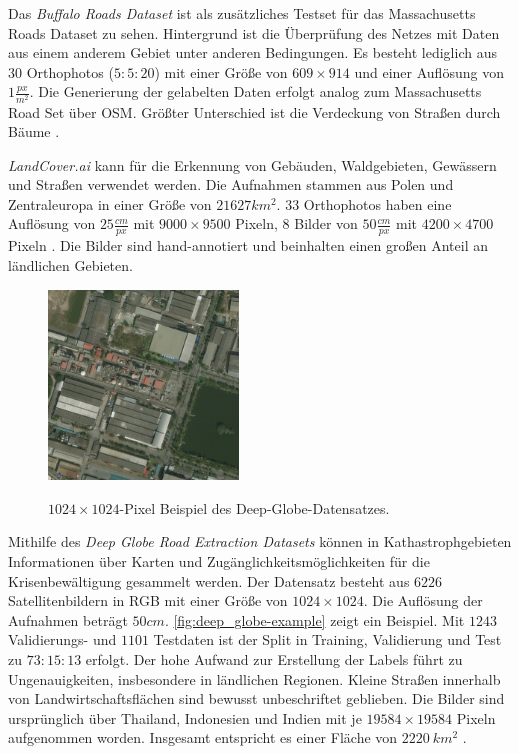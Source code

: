 Das \textit{Buffalo Roads Dataset} ist als zusätzliches Testset für das Massachusetts Roads Dataset zu sehen.
Hintergrund ist die Überprüfung des Netzes mit Daten aus einem anderem Gebiet unter anderen Bedingungen.
Es besteht lediglich aus 30 Orthophotos ($5:5:20$) mit einer Größe von $609{\times}914$ und einer Auflösung von $1 \frac{px}{m^2}$.
Die Generierung der gelabelten Daten erfolgt analog zum Massachusetts Road Set über \ac{OSM}.
Größter Unterschied ist die Verdeckung von Straßen durch Bäume \cite{Mnih.2013}.

\textit{LandCover.ai} kann für die Erkennung von Gebäuden, Waldgebieten, Gewässern und Straßen verwendet werden.
Die Aufnahmen stammen aus Polen und Zentraleuropa in einer Größe von $21627 km^2$.
$33$ Orthophotos haben eine Auflösung von $25 \frac{cm}{px}$ mit $9000{\times}9500$ Pixeln, 
$8$ Bilder von $50 \frac{cm}{px}$ mit $4200{\times}4700$ Pixeln \cite{.20.04.2022}.
Die Bilder sind hand-annotiert und beinhalten einen großen Anteil an ländlichen Gebieten.

\begin{figure}
	\centering
	\vspace{-20pt} %
	\includegraphics[width=0.45\textwidth]{Bilder/deep_globe_example.jpg}
	\vspace{-5pt}
	\caption[$1024{\times}1024$-Pixel Beispiel des Deep-Globe-Datensatzes.]{\unskip}
	$1024{\times}1024$-Pixel Beispiel des Deep-Globe-Datensatzes.
	\label{fig:deep_globe-example}
\end{figure}

Mithilfe des \textit{Deep Globe Road Extraction Datasets} können in Kathastrophgebieten Informationen über Karten und Zugänglichkeitsmöglichkeiten für die Krisenbewältigung gesammelt werden.
Der Datensatz besteht aus $6226$ Satellitenbildern in RGB mit einer Größe von $1024{\times}1024$.
Die Auflösung der Aufnahmen beträgt $50 cm$. \autoref{fig:deep_globe-example} zeigt ein Beispiel.
Mit $1243$ Validierungs- und $1101$ Testdaten ist der Split in Training, Validierung und Test zu $73:15:13$ erfolgt.
Der hohe Aufwand zur Erstellung der Labels führt zu Ungenauigkeiten, insbesondere in ländlichen Regionen. 
Kleine Straßen innerhalb von Landwirtschaftsflächen sind bewusst unbeschriftet geblieben.
Die Bilder sind ursprünglich über Thailand, Indonesien und Indien mit je $19584{\times}19584$ Pixeln aufgenommen worden.
Insgesamt entspricht es einer Fläche von $2220~km^2$ \cite{Ashwath.10.11.2020}.

